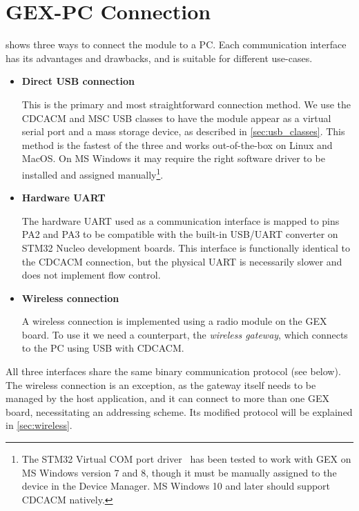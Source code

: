\section{GEX-PC Connection}

 shows three ways to connect the module to a \gls{PC}. Each communication interface has its advantages and drawbacks, and is suitable for different use-cases.

\begin{itemize}
	\item \textbf{Direct \gls{USB} connection}
		
		This is the primary and most straightforward connection method. We use the \gls{CDCACM} and \gls{MSC} \gls{USB} classes to have the module appear as a virtual serial port and a mass storage device, as described in \cref{sec:usb_classes}. This method is the fastest of the three and works out-of-the-box on Linux and MacOS. On MS Windows it may require the right software driver to be installed and assigned manually\footnote{The STM32 Virtual COM port driver~\cite{stm-vcom} has been tested to work with GEX on MS Windows version 7 and 8, though it must be manually assigned to the device in the Device Manager. MS Windows 10 and later should support \gls{CDCACM} natively.}.
	
	\item \textbf{Hardware \gls{UART}}
	
		The hardware UART used as a communication interface is mapped to pins PA2 and PA3 to be compatible with the built-in \gls{USB}/\gls{UART} converter on STM32 Nucleo development boards. This interface is functionally identical to the \gls{CDCACM} connection, but the physical \gls{UART} is necessarily slower and does not implement flow control.
		
	\item \textbf{Wireless connection}
	
		A wireless connection is implemented using a radio module on the GEX board. To use it we need a counterpart, the \textit{wireless gateway}, which connects to the \gls{PC} using \gls{USB} with \gls{CDCACM}.
	
\end{itemize}

All three interfaces share the same binary communication protocol (see below). The wireless connection is an exception, as the gateway itself needs to be managed by the host application, and it can connect to more than one GEX board, necessitating an addressing scheme. Its modified protocol will be explained in \cref{sec:wireless}.


